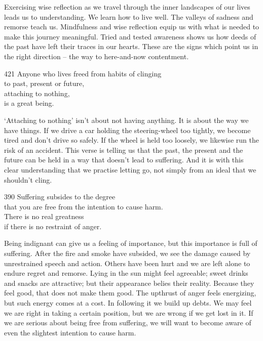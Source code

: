 \begin{dhpRefl}
Exercising wise reflection as we travel through the inner landscapes of our lives leads us to understanding. We learn how to live well. The valleys of sadness and remorse teach us. Mindfulness and wise reflection equip us with what is needed to make this journey meaningful. Tried and tested awareness shows us how deeds of the past have left their traces in our hearts. These are the signs which point us in the right direction – the way to here-and-now contentment.
\end{dhpRefl}


\begin{dhpVerse}{421}
\label{dhp-421}
Anyone who lives freed from habits of clinging\\
to past, present or future,\\
attaching to nothing,\\
is a great being.
\end{dhpVerse}

\begin{dhpRefl}
`Attaching to nothing' isn't about not having anything. It is about the way we have things. If we drive a car holding the steering-wheel too tightly, we become tired and don't drive so safely. If the wheel is held too loosely, we likewise run the risk of an accident. This verse is telling us that the past, the present and the future can be held in a way that doesn't lead to suffering. And it is with this clear understanding that we practise letting go, not simply from an ideal that we shouldn't cling.
\end{dhpRefl}


\begin{dhpVerse}{390}
\label{dhp-390}
Suffering subsides to the degree\\
that you are free from the intention to cause harm.\\
There is no real greatness\\
if there is no restraint of anger.
\end{dhpVerse}

\begin{dhpRefl}
Being indignant can give us a feeling of importance, but this importance is full of suffering. After the fire and smoke have subsided, we see the damage caused by unrestrained speech and action. Others have been hurt and we are left alone to endure regret and remorse. Lying in the sun might feel agreeable; sweet drinks and snacks are attractive; but their appearance belies their reality. Because they feel good, that does not make them good. The upthrust of anger feels energizing, but such energy comes at a cost. In following it we build up debts. We may feel we are right in taking a certain position, but we are wrong if we get lost in it. If we are serious about being free from suffering, we will want to become aware of even the slightest intention to cause harm.
\end{dhpRefl}

